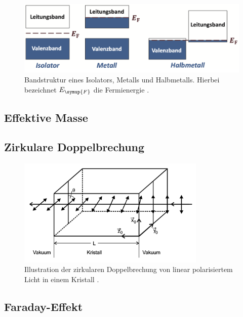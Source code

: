 \begin{figure}
    \centering
    \includegraphics[width=\textwidth]{content/pics/Bandstruktur.png}
    \caption{Bandstruktur eines Isolators, Metalls und Halbmetalls. Hierbei bezeichnet $E_{\symup{F}}$ die Fermienergie \cite{GrossMarx2018}.}
    \label{fig:Bandstruktur}
\end{figure}

\subsection{Effektive Masse}
\label{subsec:Effektive Masse}

\subsection{Zirkulare Doppelbrechung}
\label{subsec:Zirkulare Doppelbrechung}

\begin{figure}
    \centering
    \includegraphics[width=0.8\textwidth]{content/pics/Zirkulare_Doppelbrechung.png}
    \caption{Illustration der zirkularen Doppelbrechung von linear polarisiertem Licht in einem Kristall \cite{V46_Anhang}.}
    \label{fig:Zirkulare Doppelbrechung}
\end{figure}

\subsection{Faraday-Effekt}
\label{subsec:Faraday-Effekt}


